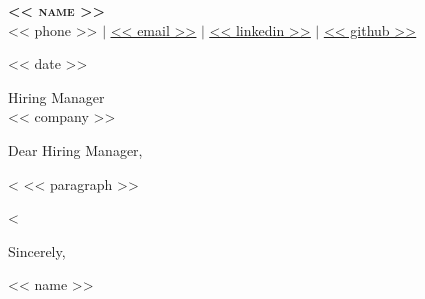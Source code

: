 \documentclass[letterpaper,11pt]{article}
\begin{document}
\begin{center}
    \textbf{\Huge \scshape << name >>} \\ \vspace{1pt}
    \small << phone >> $|$ \href{mailto:<< email >>}{\underline{<< email >>}} $|$
    \href{<< linkedin_url >>}{\underline{<< linkedin >>}} $|$
    \href{<< github_url >>}{\underline{<< github >>}}
\end{center}

\vspace{1em}

<< date >>

\vspace{1em}

Hiring Manager \\
<< company >>

\vspace{1em}

Dear Hiring Manager,

\vspace{0.5em}

<%
<< paragraph >>

<%

Sincerely,

\vspace{2em}

<< name >>
\end{document}
